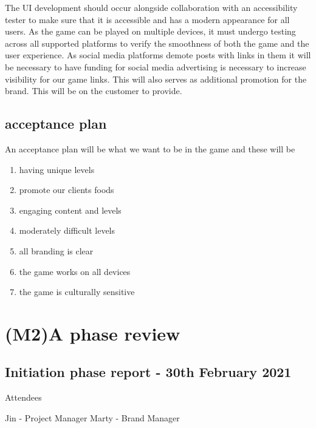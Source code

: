 \documentclass{article}
\begin{document}
The UI development should occur alongside collaboration with an accessibility tester to make sure that it is accessible and has a modern appearance for all users. As the game can be played on multiple devices, it must undergo testing across all supported platforms to verify the smoothness of both the game and the user experience. As social media platforms demote posts with links in them it will be necessary to have funding for social media advertising is necessary to increase visibility for our game links. This will also serves as additional promotion for the brand. This will be on the customer to provide.

\subsection{acceptance plan}
An acceptance plan will be what we want to be in the game and these will be
\begin{enumerate}
    \item having unique levels
    \item promote our clients foods 
    \item engaging content and levels
    \item moderately difficult levels
    \item all branding is clear
    \item the game works on all devices
    \item the game is culturally sensitive
\end{enumerate}


\section{(M2)A phase review }

\subsection{Initiation phase report - 30th February 2021}
Attendees

Jin - Project Manager
Marty - Brand Manager
\end{document}
